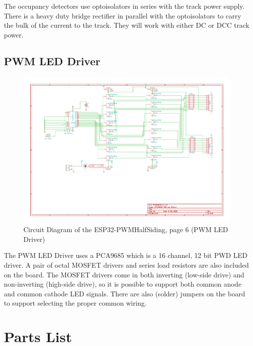 The occupancy detectors use optoisolators in series with the track power 
supply.  There is a heavy duty bridge rectifier in parallel with the 
optoisolators to carry the bulk of the current to the track.  They will work 
with either DC or DCC track power.

\clearpage
\subsection{PWM LED Driver}
\begin{figure}[hbpt]\begin{centering}%
\includegraphics[width=5in]{ESP32-PWMHalfSiding-6.pdf}
\caption{Circuit Diagram of the ESP32-PWMHalfSiding, page 6 (PWM LED Driver)}
\end{centering}\end{figure}

The PWM LED Driver uses a PCA9685 which is a 16 channel, 12 bit PWD LED 
driver.  A pair of octal MOSFET drivers and series load resistors are also 
included on the board.  The MOSFET drivers come in both inverting (low-side 
drive) and non-inverting (high-side drive), so it is possible to support both 
common anode and common cathode LED signals.  There are also (solder) jumpers 
on the board to support selecting the proper common wiring.

\clearpage
\section{Parts List}

